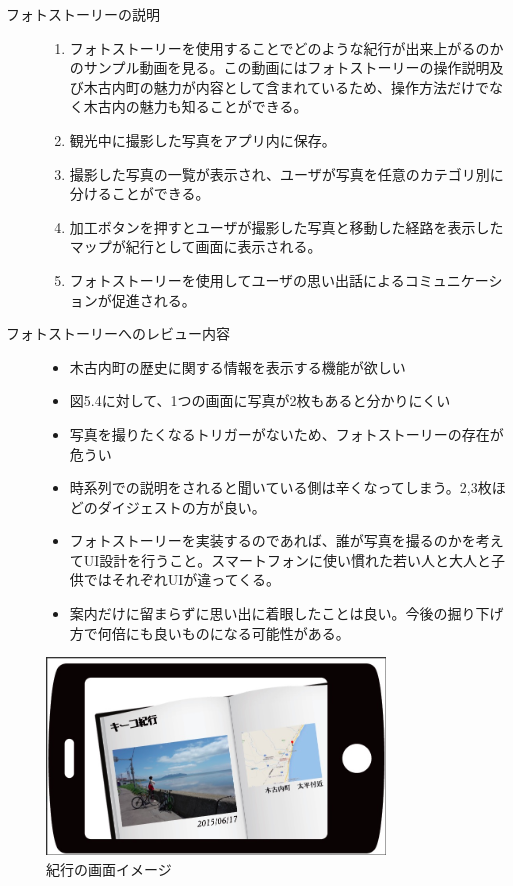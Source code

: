 \begin{description}
 \item[フォトストーリーの説明]\mbox{}
 \begin{enumerate}
 \item フォトストーリーを使用することでどのような紀行が出来上がるのかのサンプル動画を見る。この動画にはフォトストーリーの操作説明及び木古内町の魅力が内容として含まれているため、操作方法だけでなく木古内の魅力も知ることができる。
  \item 観光中に撮影した写真をアプリ内に保存。
 \item 撮影した写真の一覧が表示され、ユーザが写真を任意のカテゴリ別に分けることができる。
 \item 加工ボタンを押すとユーザが撮影した写真と移動した経路を表示したマップが紀行として画面に表示される。
 \item フォトストーリーを使用してユーザの思い出話によるコミュニケーションが促進される。
\end{enumerate}
\item[フォトストーリーへのレビュー内容]\mbox{}
 \begin{itemize}
 \item 木古内町の歴史に関する情報を表示する機能が欲しい
 \item 図5.4に対して、1つの画面に写真が2枚もあると分かりにくい
 \item 写真を撮りたくなるトリガーがないため、フォトストーリーの存在が危うい
 \item 時系列での説明をされると聞いている側は辛くなってしまう。2,3枚ほどのダイジェストの方が良い。
 \item フォトストーリーを実装するのであれば、誰が写真を撮るのかを考えてUI設計を行うこと。スマートフォンに使い慣れた若い人と大人と子供ではそれぞれUIが違ってくる。
 \item 案内だけに留まらずに思い出に着眼したことは良い。今後の掘り下げ方で何倍にも良いものになる可能性がある。
 \end{itemize}
\end{description}

\begin{figure}[htbp]
 \begin{center}
\includegraphics[width=9cm, bb=0 0 857 498]{5.1_kikou.png}
 \end{center}
\addtocounter{figure}{+0}
 \caption{紀行の画面イメージ}
 \label{fig:one}
\end{figure}
